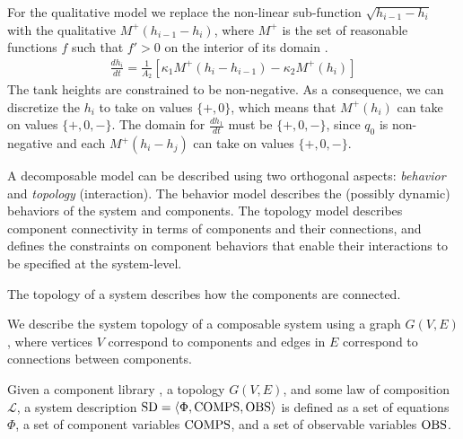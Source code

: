 %
For the qualitative model we replace the non-linear sub-function
$\sqrt{h_{i - 1} - h_i}$ with the qualitative $M^+(h_{i - 1} - h_i)$,
where $M^+$ is the set of reasonable functions $f$ such that $f' > 0$
on the interior of its domain
\citep{kuipers1994composition}.
%
\begin{eqnarray}
%
\frac{d h_i}{dt} = \frac{1}{A_2}\left[\kappa_{1} M^+(h_{i} - h_{i - 1}) - \kappa_2 M^+(h_i)\right]
%
\end{eqnarray}
%
The tank heights are constrained to be non-negative. As a consequence,
we can discretize the $h_i$ to take on values $\{+, 0\}$, which means
that $M^+(h_i)$ can take on values $\{+, 0, -\}$.  The domain for
$\frac{d h_1}{dt}$ must be $\{+, 0, -\}$, since $q_0$ is non-negative
and each $M^+(h_i - h_j)$ can take on values $\{+, 0, -\}$.
\par
A decomposable model can be described using two orthogonal aspects:
\textit{behavior} and \textit{topology} (interaction). The behavior
model describes the (possibly dynamic) behaviors of the system and
components. The topology model describes component connectivity in
terms of components and their connections, and defines the constraints
on component behaviors that enable their interactions to be specified
at the system-level.
\par
The topology of a system describes how the components are connected.
%
\begin{definition}[Topology]
%
We describe the system topology of a composable system using a graph
$G(V, E)$, where vertices $V$ correspond to components and edges in
$E$ correspond to connections between components.
%
\end{definition}
%
\begin{definition}
%
Given a component library \cl, a topology $G(V, E)$, and some law of
composition $\mathcal{L}$, a system description $\mathrm{SD} = \langle\Phi,
\mathrm{COMPS}, \mathrm{OBS}\rangle$ is defined as a set of
equations $\Phi$, a set of component variables $\mathrm{COMPS}$, and a set of
observable variables $\mathrm{OBS}$.
%
\end{definition}
%
%
%
%
%


